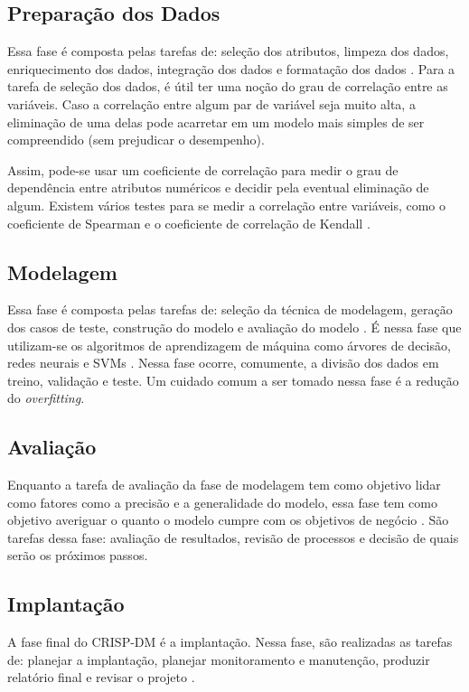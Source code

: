\subsection{Preparação dos Dados}
Essa fase é composta pelas tarefas de: seleção dos atributos, limpeza dos dados, 
enriquecimento dos dados, integração dos dados e formatação dos dados \cite{crispdm}.
Para a tarefa de seleção dos dados, é útil ter uma noção do grau de correlação entre
as variáveis.  Caso a correlação entre algum par de variável seja muito alta, a
eliminação de uma delas pode acarretar em um modelo mais simples de ser compreendido
(sem prejudicar o desempenho).
\par Assim, pode-se usar um coeficiente de correlação para medir o grau de dependência
entre atributos numéricos e decidir pela eventual eliminação de algum. Existem vários
testes para se medir a correlação entre variáveis, como o coeficiente de Spearman e o
coeficiente de correlação de Kendall \cite{kendall}. 

\subsection{Modelagem} 
Essa fase é composta pelas tarefas de: seleção da técnica de modelagem, geração dos
casos de teste, construção do modelo e avaliação do modelo \cite{crispdm}. É nessa
fase que utilizam-se os algoritmos de aprendizagem de máquina como árvores de decisão,
redes neurais e SVMs \cite{ml_second_book}. Nessa fase ocorre, comumente, a divisão
dos dados em treino, validação e teste. Um cuidado comum a ser tomado nessa fase é a
redução do \textit{overfitting}.

\subsection{Avaliação} 
Enquanto a tarefa de avaliação da fase de modelagem tem como objetivo lidar como
fatores como a precisão e a generalidade do modelo, essa fase tem como objetivo
averiguar o quanto o modelo cumpre com os objetivos de negócio \cite{crispdm}. São
tarefas dessa fase: avaliação de resultados, revisão de processos e decisão de quais
serão os próximos passos.

\subsection{Implantação} 
A fase final do CRISP-DM é a implantação. Nessa fase, são realizadas as tarefas de:
planejar a implantação, planejar monitoramento e manutenção, produzir relatório final
e revisar o projeto \cite{crispdm}.

